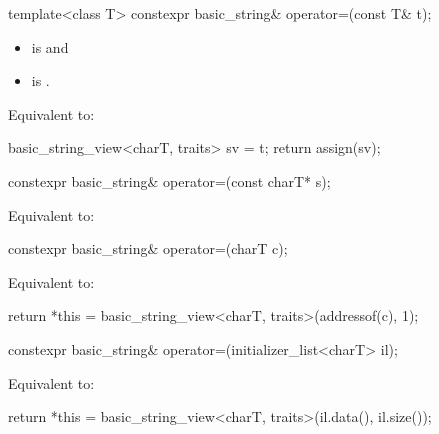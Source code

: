 %
\begin{itemdecl}
template<class T>
  constexpr basic_string& operator=(const T& t);
\end{itemdecl}

\begin{itemdescr}
\pnum
\constraints
\begin{itemize}
\item {}
is  and
\item {}
is .
\end{itemize}

\pnum
\effects
Equivalent to:
\begin{codeblock}
basic_string_view<charT, traits> sv = t;
return assign(sv);
\end{codeblock}
\end{itemdescr}

%
\begin{itemdecl}
constexpr basic_string& operator=(const charT* s);
\end{itemdecl}

\begin{itemdescr}
\pnum
\effects
Equivalent to:
\end{itemdescr}

%
\begin{itemdecl}
constexpr basic_string& operator=(charT c);
\end{itemdecl}

\begin{itemdescr}
\pnum
\effects
Equivalent to:
\begin{codeblock}
return *this = basic_string_view<charT, traits>(addressof(c), 1);
\end{codeblock}
\end{itemdescr}

%
\begin{itemdecl}
constexpr basic_string& operator=(initializer_list<charT> il);
\end{itemdecl}

\begin{itemdescr}
\pnum
\effects
Equivalent to:
\begin{codeblock}
return *this = basic_string_view<charT, traits>(il.data(), il.size());
\end{codeblock}
\end{itemdescr}

